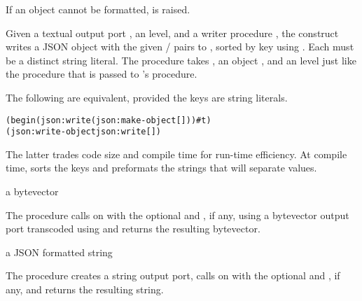 If an object cannot be formatted, 
is raised.

\begin{syntax}
\end{syntax}
\returns{} 

Given a textual output port , an  level, and a
writer procedure , the  construct
writes a JSON object with the given  /  pairs to
, sorted by key using .  Each  must be
a distinct string literal.  The  procedure takes , an
object , and an  level just like the 
procedure that is passed to 's 
procedure.

The following are equivalent, provided the keys are string literals.

\antipar\begin{alltt}
(begin (json:write  (json:make-object [ ] \etc) ) \#t)
(json:write-object   json:write [ ] \etc)\end{alltt}\antipar

The latter trades code size and compile time for run-time efficiency.
At compile time,  sorts the keys and
preformats the strings that will separate values.

\begin{procedure}
\end{procedure}
\returns{} a bytevector

The  procedure calls 
on  with the optional  and , if
any, using a bytevector output port transcoded using
 and returns the resulting bytevector.

\begin{procedure}
\end{procedure}
\returns{} a JSON formatted string

The  procedure creates a string output port,
calls  on  with the optional  and
, if any, and returns the resulting string.

